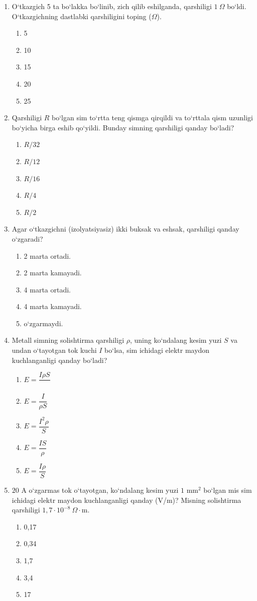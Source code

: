\begin{enumerate}
\item O‘tkazgich 5 ta bo‘lakka bo‘linib, zich qilib eshilganda, qarshiligi $1~\Omega$ bo‘ldi. O‘tkazgichning dastlabki qarshiligini toping ($\Omega$).
\begin{enumerate}[label=\Alph*)]
\item 5
\item 10
\item 15
\item 20
\item 25
\end{enumerate}

\item Qarshiligi $R$ bo‘lgan sim to‘rtta teng qismga qirqildi va to‘rttala qism uzunligi bo‘yicha birga eshib qo‘yildi. Bunday simning qarshiligi qanday bo‘ladi?
\begin{enumerate}[label=\Alph*)]
\item $R/32$
\item $R/12$
\item $R/16$
\item $R/4$
\item $R/2$
\end{enumerate}

\item Agar o‘tkazgichni (izolyatsiyasiz) ikki buksak va eshsak, qarshiligi qanday o‘zgaradi?
\begin{enumerate}[label=\Alph*)]
\item 2 marta ortadi.
\item 2 marta kamayadi.
\item 4 marta ortadi.
\item 4 marta kamayadi.
\item o‘zgarmaydi.
\end{enumerate}

\item Metall simning solishtirma qarshiligi $\rho$, uning ko‘ndalang kesim yuzi $S$ va undan o‘tayotgan tok kuchi $I$ bo‘lsa, sim ichidagi elektr maydon kuchlanganligi qanday bo‘ladi?
\begin{enumerate}[label=\Alph*)]
\item $E=\dfrac{I\rho S}{ }$
\item $E=\dfrac{I}{\rho S}$
\item $E=\dfrac{I^2\rho}{S}$
\item $E=\dfrac{IS}{\rho}$
\item $E=\dfrac{I\rho}{S}$
\end{enumerate}

\item $20$ A o‘zgarmas tok o‘tayotgan, ko‘ndalang kesim yuzi $1$ mm$^2$ bo‘lgan mis sim ichidagi elektr maydon kuchlanganligi qanday (V/m)? Misning solishtirma qarshiligi $1,7\cdot10^{-8}~\Omega\cdot$m.
\begin{enumerate}[label=\Alph*)]
\item 0,17
\item 0,34
\item 1,7
\item 3,4
\item 17
\end{enumerate}


\end{enumerate}
